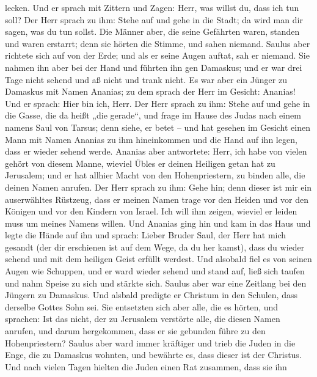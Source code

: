 lecken.  Und er sprach mit Zittern und Zagen: Herr, was
willst du, dass ich tun soll? Der Herr sprach zu ihm: Stehe auf und gehe
in die Stadt; da wird man dir sagen, was du tun sollst.  Die
Männer aber, die seine Gefährten waren, standen und waren erstarrt; denn
sie hörten die Stimme, und sahen niemand.  Saulus aber
richtete sich auf von der Erde; und als er seine Augen auftat, sah er
niemand. Sie nahmen ihn aber bei der Hand und führten ihn gen Damaskus;
 und er war drei Tage nicht sehend und aß nicht und trank
nicht.  Es war aber ein Jünger zu Damaskus mit Namen
Ananias; zu dem sprach der Herr im Gesicht: Ananias! Und er sprach: Hier
bin ich, Herr.  Der Herr sprach zu ihm: Stehe auf und gehe
in die Gasse, die da heißt „die gerade``, und frage im Hause des Judas
nach einem namens Saul von Tarsus; denn siehe, er betet -- 
und hat gesehen im Gesicht einen Mann mit Namen Ananias zu ihm
hineinkommen und die Hand auf ihn legen, dass er wieder sehend werde.
 Ananias aber antwortete: Herr, ich habe von vielen gehört
von diesem Manne, wieviel Übles er deinen Heiligen getan hat zu
Jerusalem;  und er hat allhier Macht von den
Hohenpriestern, zu binden alle, die deinen Namen anrufen. 
Der Herr sprach zu ihm: Gehe hin; denn dieser ist mir ein auserwähltes
Rüstzeug, dass er meinen Namen trage vor den Heiden und vor den Königen
und vor den Kindern von Israel.  Ich will ihm zeigen,
wieviel er leiden muss um meines Namens willen.  Und
Ananias ging hin und kam in das Haus und legte die Hände auf ihn und
sprach: Lieber Bruder Saul, der Herr hat mich gesandt (der dir
erschienen ist auf dem Wege, da du her kamst), dass du wieder sehend und
mit dem heiligen Geist erfüllt werdest.  Und alsobald fiel
es von seinen Augen wie Schuppen, und er ward wieder sehend
 und stand auf, ließ sich taufen und nahm Speise zu sich
und stärkte sich. Saulus aber war eine Zeitlang bei den Jüngern zu
Damaskus.  Und alsbald predigte er Christum in den Schulen,
dass derselbe Gottes Sohn sei.  Sie entsetzten sich aber
alle, die es hörten, und sprachen: Ist das nicht, der zu Jerusalem
verstörte alle, die diesen Namen anrufen, und darum hergekommen, dass er
sie gebunden führe zu den Hohenpriestern?  Saulus aber ward
immer kräftiger und trieb die Juden in die Enge, die zu Damaskus
wohnten, und bewährte es, dass dieser ist der Christus. 
Und nach vielen Tagen hielten die Juden einen Rat zusammen, dass sie ihn
